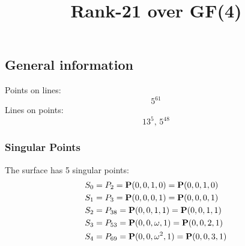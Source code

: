 \documentclass{article}
\newcommand\setTBstruts{\def\T{\rule{0pt}{2.6ex}}%
\def\B{\rule[-1.2ex]{0pt}{0pt}}}
\newcommand{\bP}{{\bf P}}
\begin{document}
 
\setTBstruts



{\allowdisplaybreaks%






\title{Rank-21 over GF(4)}
\author{}%
\maketitle%
%
{}



\subsection*{General information}
Points on lines:
$$
5^{61}$$
Lines on points:
$$
13^5,\,5^{48}$$
\subsubsection*{Singular Points}
The surface has 5 singular points:\\
\begin{align*}
S_{0} &= P_{2}=\bP(0, 0, 1, 0) = \bP(0, 0, 1, 0)\\
S_{1} &= P_{3}=\bP(0, 0, 0, 1) = \bP(0, 0, 0, 1)\\
S_{2} &= P_{38}=\bP(0, 0, 1, 1) = \bP(0, 0, 1, 1)\\
S_{3} &= P_{53}=\bP(0, 0, \omega , 1) = \bP(0, 0, 2, 1)\\
S_{4} &= P_{69}=\bP(0, 0, \omega^{2}, 1) = \bP(0, 0, 3, 1)\\
\end{align*}
}
\end{document}
